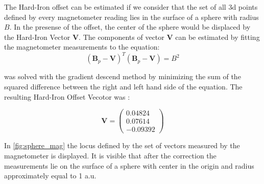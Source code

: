 The Hard-Iron offset can be estimated if we consider that the set of all 3d points defined by every magnetometer reading lies in the surface of a sphere with radius \ensuremath{B}. In the presense of the offset, the center of the sphere would be displaced by the Hard-Iron Vector \ensuremath{\boldsymbol{V}}. The components of vector \ensuremath{\boldsymbol{V}} can be estimated by fitting the magnetometer measurements to the equation:
\begin{equation}
    \left(\boldsymbol{B}_{p}-\boldsymbol{V}\right)^{T}\left(\boldsymbol{B}_{p}-\boldsymbol{V}\right)=B^{2}
    \label{eq:magOptim}
\end{equation}

 was solved with the gradient descend method by minimizing the  sum of the squared difference between the right and left hand side of the equation. The resulting Hard-Iron Offset Vecotor was :

\begin{equation}
    \boldsymbol{V}=\left(\begin{array}{c} 0.04824\\ 0.07614\\ -0.09392 \end{array}\right)
\end{equation}

In \cref{fig:sphere_mag} the locus defined by the set of vectors measured by the magnetometer is displayed. It is visible that after the correction the measurements lie on the surface of a sphere with center in the origin and radius approximately equal to 1 a.u.

